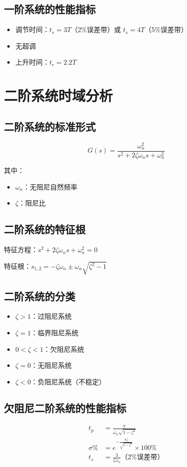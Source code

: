 \documentclass[12pt,a4paper]{article}
\begin{document}
\subsection{一阶系统的性能指标}
\begin{itemize}
    \item 调节时间：$t_s = 3T$（2\%误差带）或 $t_s = 4T$（5\%误差带）
    \item 无超调
    \item 上升时间：$t_r = 2.2T$
\end{itemize}

\section{二阶系统时域分析}

\subsection{二阶系统的标准形式}
\[G(s) = \frac{\omega_n^2}{s^2 + 2\zeta\omega_n s + \omega_n^2}\]

其中：
\begin{itemize}
    \item $\omega_n$：无阻尼自然频率
    \item $\zeta$：阻尼比
\end{itemize}

\subsection{二阶系统的特征根}
特征方程：$s^2 + 2\zeta\omega_n s + \omega_n^2 = 0$

特征根：$s_{1,2} = -\zeta\omega_n \pm \omega_n\sqrt{\zeta^2 - 1}$

\subsection{二阶系统的分类}
\begin{itemize}
    \item $\zeta > 1$：过阻尼系统
    \item $\zeta = 1$：临界阻尼系统
    \item $0 < \zeta < 1$：欠阻尼系统
    \item $\zeta = 0$：无阻尼系统
    \item $\zeta < 0$：负阻尼系统（不稳定）
\end{itemize}

\subsection{欠阻尼二阶系统的性能指标}
\begin{align}
t_p &= \frac{\pi}{\omega_n\sqrt{1-\zeta^2}} \\
\sigma\% &= e^{-\frac{\pi\zeta}{\sqrt{1-\zeta^2}}} \times 100\% \\
t_s &= \frac{3}{\zeta\omega_n} \text{（2\%误差带）}
\end{align}
\end{document}
